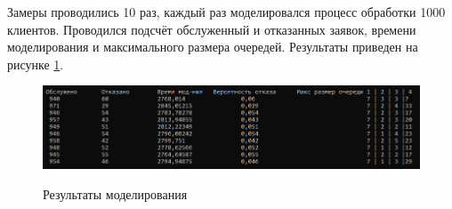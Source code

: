 Замеры проводились 10 раз, каждый раз моделировался процесс обработки 1000 клиентов. Проводился подсчёт обслуженный и отказанных заявок, времени моделирования и максимального размера очередей. Результаты приведен на рисунке \ref{fig3:image}.

\begin{figure}[h]
	\begin{center}
		{\includegraphics[scale = 0.75]{img/results.png}}
		\caption{Результаты моделирования}
		\label{fig3:image}
	\end{center}
\end{figure}